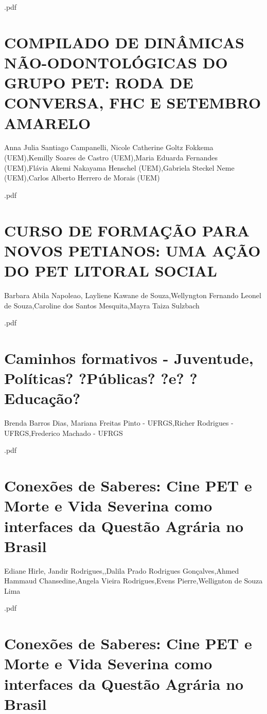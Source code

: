 

.pdf\section{COMPILADO DE DINÂMICAS NÃO-ODONTOLÓGICAS DO GRUPO PET: RODA DE CONVERSA, FHC E SETEMBRO AMARELO}

Anna Julia Santiago Campanelli, Nicole Catherine Goltz Fokkema (UEM),Kemilly Soares de Castro (UEM),Maria Eduarda Fernandes (UEM),Flávia Akemi Nakayama Henschel (UEM),Gabriela Steckel Neme (UEM),Carlos Alberto Herrero de Morais (UEM)



.pdf\section{CURSO DE FORMAÇÃO PARA NOVOS PETIANOS: UMA AÇÃO DO PET LITORAL  SOCIAL}

Barbara Abila Napoleao, Layliene Kawane de Souza,Wellyngton Fernando Leonel de  Souza,Caroline dos Santos Mesquita,Mayra Taiza Sulzbach



.pdf\section{Caminhos formativos - Juventude, Políticas? ?Públicas? ?e? ?Educação?}

Brenda Barros Dias, Mariana Freitas Pinto - UFRGS,Richer Rodrigues - UFRGS,Frederico Machado - UFRGS



.pdf\section{Conexões de Saberes: Cine PET e Morte e Vida Severina como interfaces da Questão  Agrária no Brasil}

Ediane Hirle, Jandir Rodrigues,,Dalila Prado  Rodrigues Gonçalves,Ahmed Hammaud Chansedine,Angela Vieira Rodrigues,Evens Pierre,Wellignton de Souza Lima



.pdf\section{Conexões de Saberes: Cine PET e Morte e Vida Severina como interfaces da Questão Agrária no Brasil}

